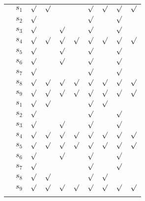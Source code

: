 \begin{table}[!h]
\begin{tabular}{c|c!{\vrule width 1.3pt}x{12mm}|x{12mm}|x{12mm}|x{12mm}!{\vrule width 1.3pt}x{12mm}|x{12mm}|x{12mm}|x{12mm}}
 &$s_1$&$\surd$&$\surd$&       &       &$\surd$&$\surd$&$\surd$&$\surd$ \\
 &$s_2$&$\surd$&       &       &       &$\surd$&       &$\surd$&        \\
 &$s_3$&$\surd$&       &$\surd$&       &$\surd$&       &$\surd$&        \\
 &$s_4$&$\surd$&$\surd$&$\surd$&$\surd$&$\surd$&$\surd$&$\surd$&$\surd$ \\
 &$s_5$&$\surd$&       &$\surd$&       &$\surd$&       &$\surd$&        \\
 &$s_6$&$\surd$&       &$\surd$&       &$\surd$&       &$\surd$&        \\
 &$s_7$&$\surd$&       &       &       &$\surd$&       &$\surd$&        \\
 &$s_8$&$\surd$&$\surd$&$\surd$&$\surd$&$\surd$&$\surd$&$\surd$&$\surd$ \\
 &$s_9$&$\surd$&$\surd$&$\surd$&$\surd$&$\surd$&$\surd$&$\surd$&$\surd$ \\[1mm]



 &$s_1$&$\surd$&$\surd$&       &       &$\surd$&$\surd$&       &        \\
 &$s_2$&$\surd$&       &       &       &$\surd$&       &$\surd$&        \\
 &$s_3$&$\surd$&       &$\surd$&       &$\surd$&       &$\surd$&        \\
 &$s_4$&$\surd$&$\surd$&$\surd$&$\surd$&$\surd$&$\surd$&$\surd$&$\surd$ \\
 &$s_5$&$\surd$&$\surd$&$\surd$&$\surd$&$\surd$&$\surd$&$\surd$&$\surd$ \\
 &$s_6$&$\surd$&       &$\surd$&       &$\surd$&       &$\surd$&        \\
 &$s_7$&$\surd$&       &       &       &$\surd$&       &$\surd$&        \\
 &$s_8$&$\surd$&$\surd$&       &       &$\surd$&$\surd$&       &        \\
 &$s_9$&$\surd$&$\surd$&$\surd$&$\surd$&$\surd$&$\surd$&$\surd$&$\surd$ \\[1mm]



\end{tabular}
\end{table}
